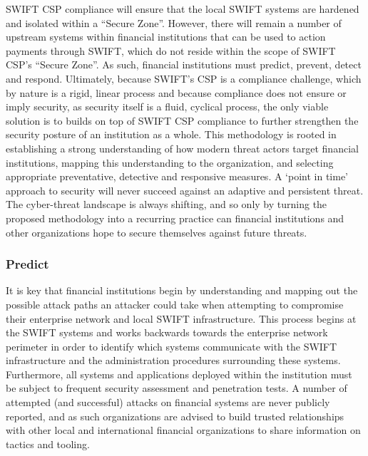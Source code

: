 \documentclass[12pt]{article}
\begin{document}
        SWIFT CSP compliance will ensure that the local SWIFT systems are hardened and isolated within a “Secure Zone”. However, there will remain a number of upstream systems within financial institutions that can be used to action payments through SWIFT, which do not reside within the scope of SWIFT CSP’s “Secure Zone”. As such, financial institutions must predict, prevent, detect and respond. Ultimately, because SWIFT’s CSP is a compliance challenge, which by nature is a rigid, linear process and because compliance does not ensure or imply security, as security itself is a fluid, cyclical process, the only viable solution is to builds on top of SWIFT CSP compliance to further strengthen the security posture of an institution as a whole. This methodology is rooted in establishing a strong understanding of how modern threat actors target financial institutions, mapping this understanding to the organization, and selecting appropriate preventative, detective and responsive measures. A ‘point in time’ approach to security will never succeed against an adaptive and persistent threat. The cyber-threat landscape is always shifting, and so only by turning the proposed methodology into a recurring practice can financial institutions and other organizations hope to secure themselves against future threats.\cite{SWIFTThreatAnalysis}
        
        \subsubsection{Predict}
        It is key that financial institutions begin by understanding and mapping out the possible attack paths an attacker could take when attempting to compromise their enterprise network and local SWIFT infrastructure. This process begins at the SWIFT systems and works backwards towards the enterprise network perimeter in order to identify which systems communicate with the SWIFT infrastructure and the administration procedures surrounding these systems.
        Furthermore, all systems and applications deployed within the institution must be subject to frequent security assessment and penetration tests. A number of attempted (and successful) attacks on financial systems are never publicly reported, and as such organizations are advised to build trusted relationships with other local and international financial organizations to share information on tactics and tooling.
\end{document}
